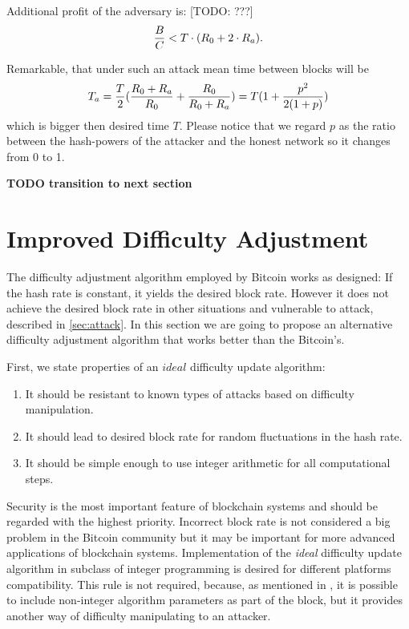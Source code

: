 \documentclass[]{llncs}
\begin{document}
Additional profit of the adversary is:
[TODO: ???]
\begin{equation}
{{B\over C} < T\cdot (R_0+2\cdot R_a)}.
\end{equation}



Remarkable, that under such an attack mean time between blocks will be
\begin{equation}
\label{eq:ati}
{T_a={T\over 2}({R_0+R_a\over R_0} + {R_0\over R_0+R_a})=T(1 + {p^2\over 2(1+p)})}
\end{equation}
which is bigger then desired time \(T\).
Please notice that we regard \(p\) as the ratio between the hash-powers of the attacker and the honest network so it changes from 0 to 1.

\textbf{TODO transition to next section}

\section{Improved Difficulty Adjustment}
\label{sec:improved}

The difficulty adjustment algorithm employed by Bitcoin works as designed: If the hash rate is constant, it yields the desired block rate. However it does not achieve the desired block rate in other situations and vulnerable to attack, described in \ref{sec:attack}.
In this section we are going to propose an alternative difficulty adjustment algorithm that works better than the Bitcoin's.

First, we state properties of an \(ideal\) difficulty update algorithm:
\begin{enumerate}
\item{It should be resistant to known types of attacks based on difficulty manipulation.}
\item{It should lead to desired block rate for random fluctuations in the hash rate.}
\item{It should be simple enough to use integer arithmetic for all computational steps.}
\end{enumerate}

Security is the most important feature of blockchain systems and should be regarded with the highest priority.
Incorrect block rate is not considered a big problem in the Bitcoin community but it may be important for more advanced applications of blockchain systems.
Implementation of the \textit{ideal} difficulty update algorithm in subclass of integer programming is desired for different platforms compatibility.
This rule is not required, because, as mentioned in \cite{kraft2015difficulty}, it is possible to include non-integer algorithm parameters as part of the block, but it provides another way of difficulty manipulating to an attacker.
\end{document}
